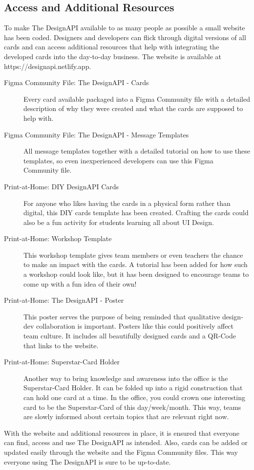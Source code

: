 \newpage
\subsection{Access and Additional Resources}
To make The DesignAPI available to as many people as possible a small website has been coded.
Designers and developers can flick through digital versions of all cards and can access additional
resources that help with integrating the developed cards into the day-to-day business. The website
is available at https://designapi.netlify.app. 

\begin{description}
    \item[Figma Community File: The DesignAPI - Cards] Every card available packaged into a Figma
    Community file with a detailed description of why they were created and what the cards are
    supposed to help with.
    \item[Figma Community File: The DesignAPI - Message Templates] All message templates together
    with a detailed tutorial on how to use these templates, so even inexperienced developers can use
    this Figma Community file.
    \item[Print-at-Home: DIY DesignAPI Cards] For anyone who likes having the cards in a physical
    form rather than digital, this DIY cards template has been created. Crafting the cards could
    also be a fun activity for students learning all about UI Design.
    \item[Print-at-Home: Workshop Template] This workshop template gives team members or even
    teachers the chance to make an impact with the cards. A tutorial has been added for how such a
    workshop could look like, but it has been designed to encourage teams to come up with a
    fun idea of their own! 
    \item[Print-at-Home: The DesignAPI - Poster] This poster serves the purpose of being reminded
    that qualitative design-dev collaboration is important. Posters like this could positively
    affect team culture. It includes all beautifully designed cards and a QR-Code that links to the
    website. 
    \item[Print-at-Home: Superstar-Card Holder] Another way to bring knowledge and awareness into
    the office is the Superstar-Card Holder. It can be folded up into a rigid construction that can
    hold one card at a time. In the office, you could crown one interesting card to be the
    Superstar-Card of this day/week/month. This way, teams are slowly informed about certain topics
    that are relevant right now.
\end{description}

With the website and additional resources in place, it is ensured that everyone can find, access and
use The DesignAPI as intended. Also, cards can be added or updated easily through the website and
the Figma Community files. This way everyone using The DesignAPI is sure to be up-to-date.